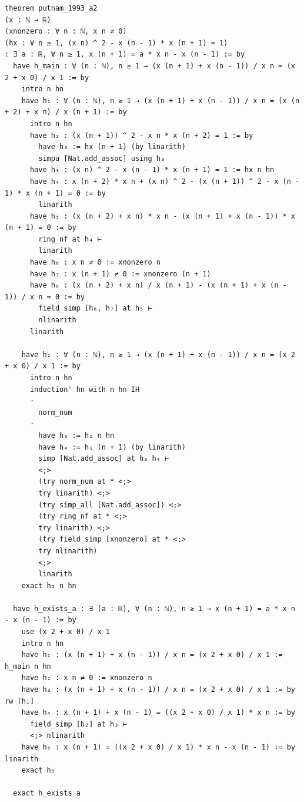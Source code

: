 \begin{tcolorbox}[colback=lightblue, boxrule=0pt, arc=5pt, outer arc=5pt, after skip=10pt plus 2pt]
\begin{lstlisting}[caption={Example of PutnamBench Eval Task (Length 715)},label={lst:putnam-eval-example}, captionpos=t, language=lean, breaklines=true, style=mystyle]
theorem putnam_1993_a2
(x : ℕ → ℝ)
(xnonzero : ∀ n : ℕ, x n ≠ 0)
(hx : ∀ n ≥ 1, (x n) ^ 2 - x (n - 1) * x (n + 1) = 1)
: ∃ a : ℝ, ∀ n ≥ 1, x (n + 1) = a * x n - x (n - 1) := by 
  have h_main : ∀ (n : ℕ), n ≥ 1 → (x (n + 1) + x (n - 1)) / x n = (x 2 + x 0) / x 1 := by
    intro n hn
    have h₁ : ∀ (n : ℕ), n ≥ 1 → (x (n + 1) + x (n - 1)) / x n = (x (n + 2) + x n) / x (n + 1) := by
      intro n hn
      have h₂ : (x (n + 1)) ^ 2 - x n * x (n + 2) = 1 := by
        have h₃ := hx (n + 1) (by linarith)
        simpa [Nat.add_assoc] using h₃
      have h₃ : (x n) ^ 2 - x (n - 1) * x (n + 1) = 1 := hx n hn
      have h₄ : x (n + 2) * x n + (x n) ^ 2 - (x (n + 1)) ^ 2 - x (n - 1) * x (n + 1) = 0 := by
        linarith
      have h₅ : (x (n + 2) + x n) * x n - (x (n + 1) + x (n - 1)) * x (n + 1) = 0 := by
        ring_nf at h₄ ⊢
        linarith
      have h₆ : x n ≠ 0 := xnonzero n
      have h₇ : x (n + 1) ≠ 0 := xnonzero (n + 1)
      have h₈ : (x (n + 2) + x n) / x (n + 1) - (x (n + 1) + x (n - 1)) / x n = 0 := by
        field_simp [h₆, h₇] at h₅ ⊢
        nlinarith
      linarith
    
    have h₂ : ∀ (n : ℕ), n ≥ 1 → (x (n + 1) + x (n - 1)) / x n = (x 2 + x 0) / x 1 := by
      intro n hn
      induction' hn with n hn IH
      · 
        norm_num
      · 
        have h₃ := h₁ n hn
        have h₄ := h₁ (n + 1) (by linarith)
        simp [Nat.add_assoc] at h₃ h₄ ⊢
        <;>
        (try norm_num at * <;>
        try linarith) <;>
        (try simp_all [Nat.add_assoc]) <;>
        (try ring_nf at * <;>
        try linarith) <;>
        (try field_simp [xnonzero] at * <;>
        try nlinarith)
        <;>
        linarith
    exact h₂ n hn
  
  have h_exists_a : ∃ (a : ℝ), ∀ (n : ℕ), n ≥ 1 → x (n + 1) = a * x n - x (n - 1) := by
    use (x 2 + x 0) / x 1
    intro n hn
    have h₁ : (x (n + 1) + x (n - 1)) / x n = (x 2 + x 0) / x 1 := h_main n hn
    have h₂ : x n ≠ 0 := xnonzero n
    have h₃ : (x (n + 1) + x (n - 1)) / x n = (x 2 + x 0) / x 1 := by rw [h₁]
    have h₄ : x (n + 1) + x (n - 1) = ((x 2 + x 0) / x 1) * x n := by
      field_simp [h₂] at h₃ ⊢
      <;> nlinarith
    have h₅ : x (n + 1) = ((x 2 + x 0) / x 1) * x n - x (n - 1) := by linarith
    exact h₅
  
  exact h_exists_a
\end{lstlisting}
\end{tcolorbox}

